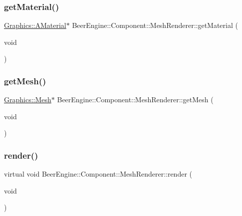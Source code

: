 \subsubsection{\texorpdfstring{get\+Material()}{getMaterial()}}
{\footnotesize\ttfamily \mbox{\hyperlink{class_beer_engine_1_1_graphics_1_1_a_material}{Graphics\+::\+A\+Material}}$\ast$ Beer\+Engine\+::\+Component\+::\+Mesh\+Renderer\+::get\+Material (\begin{DoxyParamCaption}\item[{void}]{ }\end{DoxyParamCaption})}

\mbox{\label{class_beer_engine_1_1_component_1_1_mesh_renderer_ac819f6d8c1791174fa7b9f060a8b8204}} 
\subsubsection{\texorpdfstring{get\+Mesh()}{getMesh()}}
{\footnotesize\ttfamily \mbox{\hyperlink{class_beer_engine_1_1_graphics_1_1_mesh}{Graphics\+::\+Mesh}}$\ast$ Beer\+Engine\+::\+Component\+::\+Mesh\+Renderer\+::get\+Mesh (\begin{DoxyParamCaption}\item[{void}]{ }\end{DoxyParamCaption})}

\mbox{\label{class_beer_engine_1_1_component_1_1_mesh_renderer_ace87e6038f061bf1815f047f4bc0c6e8}} 
\subsubsection{\texorpdfstring{render()}{render()}}
{\footnotesize\ttfamily virtual void Beer\+Engine\+::\+Component\+::\+Mesh\+Renderer\+::render (\begin{DoxyParamCaption}\item[{void}]{ }\end{DoxyParamCaption})\hspace{0.3cm}{\ttfamily [virtual]}}



